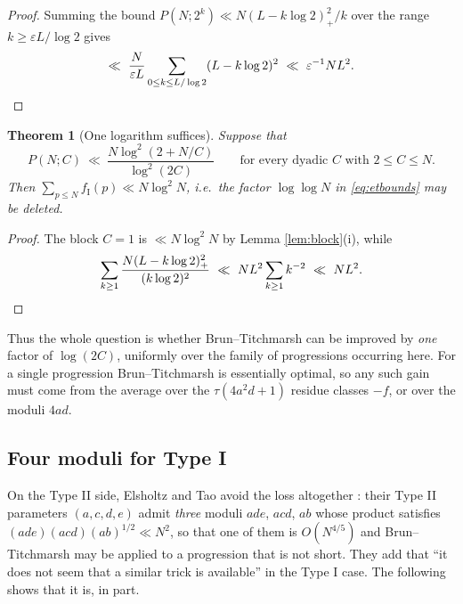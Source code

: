 \documentclass[11pt,reqno]{amsart}
\theoremstyle{plain}
\newtheorem{theorem}{Theorem}[section]
\theoremstyle{definition}
\numberwithin{equation}{section}
\newcommand{\fI}{f_{\mathrm{I}}}
\begin{document}
\begin{proof}
Summing the bound $P(N;2^{k})\ll N(L-k\log2)_{+}^{2}/k$ over the range
$k\ge\varepsilon L/\log2$ gives
\[
  \ll\ \frac{N}{\varepsilon L}\sum_{0\le k\le L/\log2}(L-k\log2)^{2}
  \ \ll\ \varepsilon^{-1}NL^{2}. \qedhere
\]
\end{proof}

\begin{theorem}[One logarithm suffices]\label{thm:red}
Suppose that
\[
  P(N;C)\ \ll\ \frac{N\log^{2}(2+N/C)}{\log^{2}(2C)}
  \qquad\text{for every dyadic }C\text{ with }2\le C\le N .
\]
Then $\sum_{p\le N}\fI(p)\ll N\log^{2}N$, i.e.\ the factor $\log\log N$ in
\eqref{eq:etbounds} may be deleted.
\end{theorem}

\begin{proof}
The block $C=1$ is $\ll N\log^{2}N$ by Lemma \ref{lem:block}(i), while
\[
  \sum_{k\ge1}\frac{N(L-k\log2)_{+}^{2}}{(k\log2)^{2}}
  \ \ll\ NL^{2}\sum_{k\ge1}k^{-2}\ \ll\ NL^{2}. \qedhere
\]
\end{proof}

Thus the whole question is whether Brun--Titchmarsh can be improved by \emph{one}
factor of $\log(2C)$, uniformly over the family of progressions occurring here. For a
single progression Brun--Titchmarsh is essentially optimal, so any such gain must come
from the average over the $\tau(4a^{2}d+1)$ residue classes $-f$, or over the moduli
$4ad$.

\subsection{Four moduli for Type I}
On the Type II side, Elsholtz and Tao avoid the loss altogether
\cite[\S9]{ElsholtzTao}: their Type II parameters $(a,c,d,e)$ admit \emph{three}
moduli $ade$, $acd$, $ab$ whose product satisfies $(ade)(acd)(ab)^{1/2}\ll N^{2}$, so
that one of them is $O(N^{4/5})$ and Brun--Titchmarsh may be applied to a progression
that is not short. They add that ``it does not seem that a similar trick is available''
in the Type I case. The following shows that it is, in part.
\end{document}
